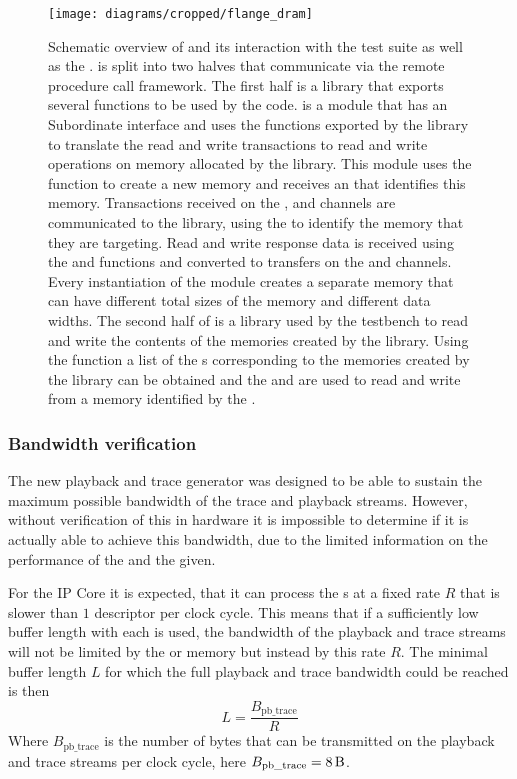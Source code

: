 \begin{figure}[htbp]
\centerline{\texttt{[image: diagrams/cropped/flange\_dram]}}
\caption{Schematic overview of \flangedram{} and its interaction with the \cpp{} test suite as well as the \systemverilog{} \DUT{}. \flangedram{} is split into two halves that communicate via the \RCF{} remote procedure call framework. The first half is a \DPI{} library that exports several functions to be used by the \systemverilog{} code.  is a \systemverilog{} module that has an \AXI{} Subordinate interface and uses the functions exported by the \flangedram{} \DPI{} library to translate the \AXI{} read and write transactions to read and write operations on memory allocated by the \flangedram{} library. This module uses the  function to create a new memory and receives an  that identifies this memory. Transactions received on the \AW{}, \AR{} and \W{} \AXI{} channels are communicated to the \DPI{} library, using the  to identify the memory that they are targeting. Read and write response data is received using the  and  functions and converted to transfers on the \R{} and \B{} channels. Every instantiation of the  module creates a separate memory that can have different total sizes of the memory and different \AXI{} data widths.
The second half of \flangedram{} is a library used by the \cpp{} testbench to read and write the contents of the memories created by the \DPI{} library. Using the  function a list of the s corresponding to the memories created by the \DPI{} library can be obtained and the  and  are used to read and write from a memory identified by the .}\label{dia:flange-dram-overview}
\end{figure}

\subsubsection{Bandwidth verification}\label{sec:pb_trace_verif}
The new playback and trace generator was designed to be able to sustain the maximum possible bandwidth of the trace and playback streams. However, without verification of this in hardware it is impossible to determine if it is actually able to achieve this bandwidth, due to the limited information on the performance of the \AXIDMA{} and the \XilinxMIG{} given.

For the \AXIDMA{} IP Core it is expected, that it can process the \descriptor{}s at a fixed rate $R$ that is slower than $1$ descriptor per clock cycle. This means that if a sufficiently low buffer length with each \descriptor{} is used, the bandwidth of the playback and trace streams will not be limited by the \XilinxMIG{} or \DDR{} memory but instead by this rate $R$.
The minimal buffer length $L$ for which the full playback and trace bandwidth could be reached is then
\[L = \frac{B_{\text{pb\_trace}}}{R}\]
Where $B_{\text{pb\_trace}}$ is the number of bytes that can be transmitted on the playback and trace streams per clock cycle, here $B_{\text{pb\_trace}} = \SI{8}{\byte}$.

